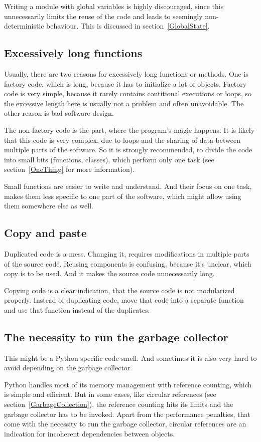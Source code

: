 			Writing a module with global variables is highly discouraged, since this unnecessarily limits the reuse of the code and leads to seemingly non-deterministic behaviour.
			This is discussed in section~\ref{GlobalState}.

		\subsection{Excessively long functions}
			Usually, there are two reasons for excessively long functions or methods.
			One is factory code, which is long, because it has to initialize a lot of objects.
			Factory code is very simple, because it rarely contains contitional executions or loops, so the excessive length here is usually not a problem and often unavoidable.
			The other reason is bad software design.

			The non-factory code is the part, where the program's magic happens.
			It is likely that this code is very complex, due to loops and the sharing of data between multiple parts of the software.
			So it is strongly recommended, to divide the code into small bits (functions, classes), which perform only one task (see section~\ref{OneThing} for more information).

			Small functions are easier to write and understand.
			And their focus on one task, makes them less specific to one part of the software, which might allow using them somewhere else as well.

		\subsection{Copy and paste}
			Duplicated code is a mess.
			Changing it, requires modifications in multiple parts of the source code.
			Reusing components is confusing, because it's unclear, which copy is to be used.
			And it makes the source code unnecessarily long.

			Copying code is a clear indication, that the source code is not modularized properly.
			Instead of duplicating code, move that code into a separate function and use that function instead of the duplicates.

		\subsection{The necessity to run the garbage collector}
			This might be a Python specific code smell.
			And sometimes it is also very hard to avoid depending on the garbage collector.

			Python handles most of its memory management with reference counting, which is simple and efficient.
			But in some cases, like circular references (see section~\ref{GarbageCollection}), the reference counting hits its limits and the garbage collector has to be invoked.
			Apart from the performance penalties, that come with the necessity to run the garbage collector, circular references are an indication for incoherent dependencies between objects.

